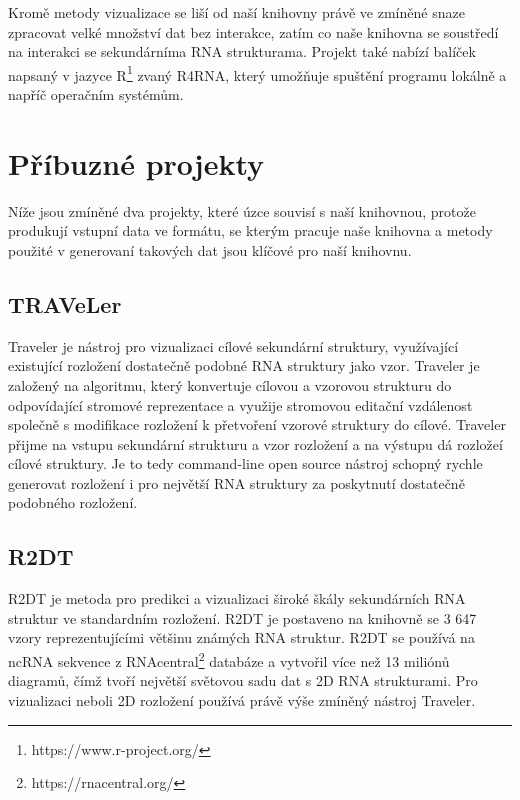   Kromě metody vizualizace se liší od naší knihovny právě ve zmíněné snaze
  zpracovat velké množství dat bez interakce, zatím co naše knihovna se
  soustředí na interakci se sekundárníma RNA strukturama. Projekt také nabízí
  balíček napsaný v jazyce R\footnote{https://www.r-project.org/} zvaný R4RNA,
  který umožňuje spuštění programu lokálně a napříč operačním systémům.

\section{Příbuzné projekty}
Níže jsou zmíněné dva projekty, které úzce souvisí s naší knihovnou, protože
produkují vstupní data ve formátu, se kterým pracuje naše knihovna a metody
použité v generovaní takových dat jsou klíčové pro naší knihovnu.

\subsection{TRAVeLer}
  Traveler\cite{Traveler2017} je nástroj pro vizualizaci cílové sekundární
  struktury, využívající existující rozložení dostatečně podobné RNA struktury
  jako vzor. Traveler je založený na algoritmu, který konvertuje cílovou a
  vzorovou strukturu do odpovídající stromové reprezentace a využije stromovou
  editační vzdálenost společně s modifikace rozložení k přetvoření vzorové
  struktury do cílové. Traveler přijme na vstupu sekundární strukturu a
  vzor rozložení a na výstupu dá rozložeí cílové struktury. Je to tedy
  command-line open source nástroj schopný rychle generovat rozložení i pro
  největší RNA struktury za poskytnutí dostatečně podobného rozložení.

\subsection{R2DT}
  R2DT\cite{R2DT2021} je metoda pro predikci a vizualizaci široké škály
  sekundárních RNA struktur ve standardním rozložení. R2DT je postaveno na
  knihovně se 3 647 vzory reprezentujícími většinu známých RNA struktur. R2DT
  se používá na ncRNA sekvence z RNAcentral\footnote{https://rnacentral.org/}
  databáze a vytvořil více než 13 miliónů diagramů, čímž tvoří největší
  světovou sadu dat s 2D RNA strukturami. Pro vizualizaci neboli 2D rozložení
  používá právě výše zmíněný nástroj Traveler.
